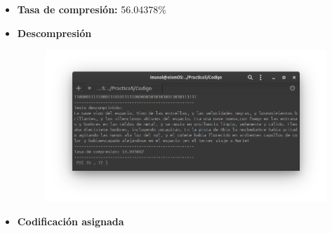 \begin{itemize}
            \item \textbf{Tasa de compresión:} 56.04378\% \\
            \item \textbf{Descompresión} \\
                \begin{figure}[h!]
                    \centering
                    \includegraphics[width=17cm]{Huffman/ejemplos/ejemplo3/ej3-decode.png}
                \end{figure}
                \newpage
            \item \textbf{Codificación asignada} \\
                \begin{figure}[h!]
                    \centering

\end{figure}
\end{itemize}
